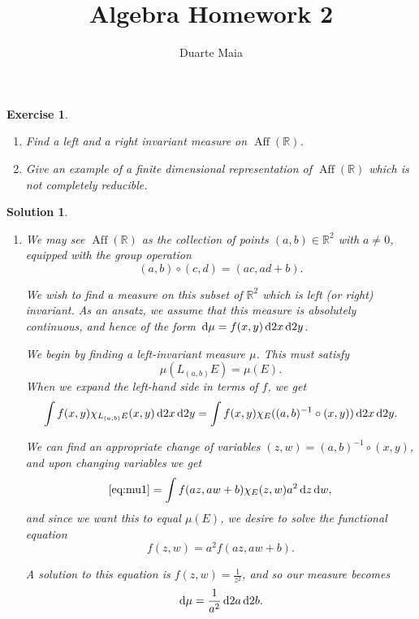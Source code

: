 \documentclass{article}
\title{Algebra Homework 2}
\author{Duarte Maia}
\newtheorem{ex}{Exercise}
\theoremstyle{nonumberplain}
\newtheorem{sol}{Solution}
\newcommand{\R}{\mathbb{R}}
\DeclareMathOperator{\Aff}{Aff}
\begin{document}
\maketitle

\begin{ex}\leavevmode
\begin{enumerate}
\item Find a left and a right invariant measure on $\Aff(\R)$.
\item Give an example of a finite dimensional representation of $\Aff(\R)$ which is not completely reducible.
\end{enumerate}
\end{ex}

\begin{sol}\leavevmode
\begin{enumerate}
\item We may see $\Aff(\R)$ as the collection of points $(a,b) \in \R^2$ with $a \neq 0$, equipped with the group operation
\begin{equation}
(a,b) \circ (c,d) = (ac, ad+b).
\end{equation}

We wish to find a measure on this subset of $\R^2$ which is left (or right) invariant. As an \textit{ansatz}, we assume that this measure is absolutely continuous, and hence of the form $\dl \mu = f(x,y) \dl2 x \dl2 y$.

We begin by finding a left-invariant measure $\mu$. This must satisfy
\begin{equation}
\mu(L_{(a,b)} E) = \mu(E).
\end{equation}
When we expand the left-hand side in terms of $f$, we get
\begin{equation}\label{eq:mu1}
\int f(x,y) \chi_{L_{(a,b)} E}(x,y) \dl2x \dl2y = \int f(x,y) \chi_E((a,b)^{-1} \circ (x,y)) \dl2x \dl2y.
\end{equation}

We can find an appropriate change of variables $(z,w) = (a,b)^{-1} \circ (x,y)$, and upon changing variables we get
\begin{equation}
\eqref{eq:mu1} = \int f(az, aw+b) \chi_E(z,w) a^2 \dl z \dl w,
\end{equation}
and since we want this to equal $\mu(E)$, we desire to solve the functional equation
\begin{equation}
f(z,w) = a^2 f(az, aw+b).
\end{equation}

A solution to this equation is $f(z,w) = \frac1{z^2}$, and so our measure becomes
\begin{equation}
\dl \mu = \frac1{a^2} \dl2a \dl2b.
\end{equation}


\end{enumerate}
\end{sol}
\end{document}
